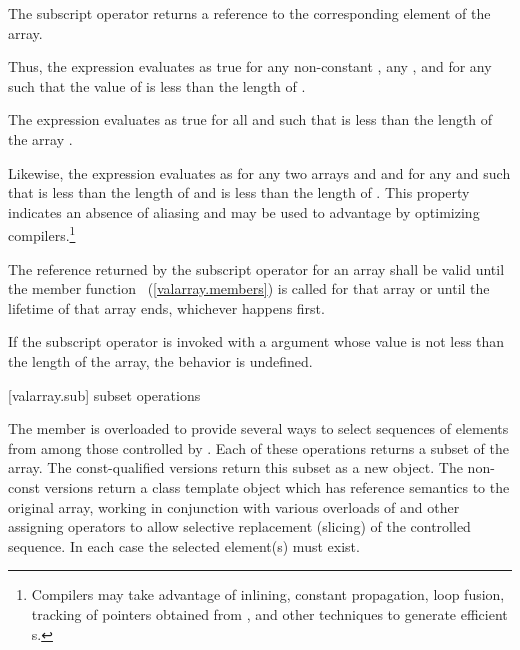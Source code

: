 \begin{itemdescr}
\pnum
The subscript operator
returns a reference to the corresponding element of the array.

\pnum
Thus, the expression
evaluates as true for any non-constant
,
any
,
and for any
such that the value of
is less than the length of
.

\pnum
The expression
evaluates as true for all
and
such that
is less than the length of the array
.

\pnum
Likewise, the expression
evaluates as
for any two arrays
and
and for any
and
such that
is less than the length of
and
is less than the length of
.
This property indicates an absence of aliasing and may be used to
advantage by optimizing compilers.\footnote{Compilers may take advantage
of inlining, constant propagation, loop fusion,
tracking of pointers obtained from
,
and other
techniques to generate efficient
s.}

\pnum
The reference returned by the subscript operator for an array shall
be valid until the member function
~(\ref{valarray.members}) is called for that array or until the lifetime of
that array ends, whichever happens first.

\pnum
If the subscript operator
is invoked with a
argument whose value is not
less than the length of the array, the behavior is undefined.%
\end{itemdescr}

[valarray.sub]{ subset operations}

%
\pnum
The member  is overloaded to provide several ways to select
sequences of elements from among those controlled by . Each of these
operations returns a subset of the array. The const-qualified versions return this
subset as a new  object. The non-const versions return a class
template object which has reference semantics to the original array, working in
conjunction with various overloads of  and other assigning
operators to allow selective replacement (slicing) of the controlled sequence.
In each case the selected element(s) must exist.

